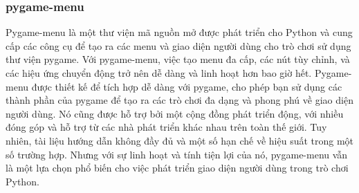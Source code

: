 \documentclass[a4paper]{article}
\begin{document}
\subsubsection{pygame-menu}
\begin{par}
    Pygame-menu là một thư viện mã nguồn mở được phát triển cho Python và cung cấp các công cụ để tạo ra các menu và giao diện người dùng cho trò chơi sử dụng thư viện pygame. Với pygame-menu, việc tạo menu đa cấp, các nút tùy chỉnh, và các hiệu ứng chuyển động trở nên dễ dàng và linh hoạt hơn bao giờ hết. Pygame-menu được thiết kế để tích hợp dễ dàng với pygame, cho phép bạn sử dụng các thành phần của pygame để tạo ra các trò chơi đa dạng và phong phú về giao diện người dùng. Nó cũng được hỗ trợ bởi một cộng đồng phát triển động, với nhiều đóng góp và hỗ trợ từ các nhà phát triển khác nhau trên toàn thế giới. Tuy nhiên, tài liệu hướng dẫn không đầy đủ và một số hạn chế về hiệu suất trong một số trường hợp. Nhưng với sự linh hoạt và tính tiện lợi của nó, pygame-menu vẫn là một lựa chọn phổ biến cho việc phát triển giao diện người dùng trong trò chơi Python.
\end{par}
\end{document}
